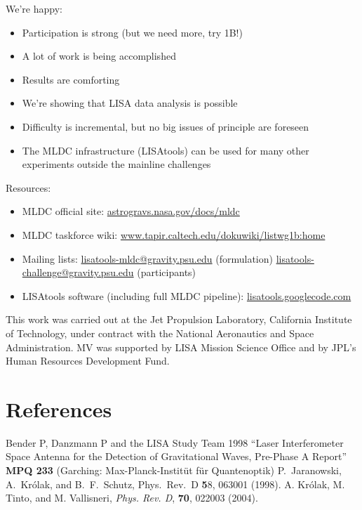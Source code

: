 \documentclass{iopart}
\begin{document}
We're happy:
\begin{itemize}
\item Participation is strong (but we need more, try 1B!)
\item A lot of work is being accomplished
\item Results are comforting
\item We’re showing that LISA data analysis is possible
\item Difficulty is incremental, but no big issues of principle are foreseen
\item The MLDC infrastructure (LISAtools) can be used for many other experiments outside the mainline challenges
\end{itemize}

Resources:
\begin{itemize}
\item MLDC official site:	\url{astrogravs.nasa.gov/docs/mldc}
\item MLDC taskforce wiki: \url{www.tapir.caltech.edu/dokuwiki/listwg1b:home}
\item Mailing lists: \url{lisatools-mldc@gravity.psu.edu} (formulation) \url{lisatools-challenge@gravity.psu.edu} (participants)
\item LISAtools software (including full MLDC pipeline): \url{lisatools.googlecode.com}
\end{itemize}


\ack

This work was carried out at the Jet Propulsion Laboratory, California Institute of Technology, under contract with the National Aeronautics and Space Administration. MV was supported by LISA Mission Science Office and by JPL's Human Resources Development Fund.



\section*{References}

\begin{thebibliography}{99}
%
 Bender P, Danzmann P and
  the LISA Study Team 1998 ``Laser Interferometer Space Antenna for the Detection of Gravitational Waves, Pre-Phase A Report'' \textbf{MPQ 233} (Garching: Max-Planck-Instit\"ut f\"ur
  Quantenoptik) 
%
P.\ Jaranowski, A.\ Kr\'olak, and B.\ F.\ Schutz, Phys.\ Rev.\ D
{\textbf 58}, 063001 (1998).
%
 A. Kr\'olak, M. Tinto, and M. Vallisneri, {\it Phys. Rev. D}, {\bf 70},
022003 (2004).
%
\end{thebibliography}
\end{document}
